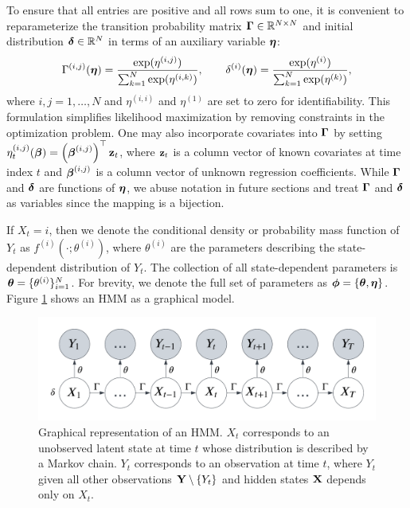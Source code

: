 To ensure that all entries are positive and all rows sum to one, it is convenient to reparameterize the transition probability matrix $\boldsymbol{\Gamma} \in \mathbb{R}^{N \times N}$ and initial distribution $\boldsymbol{\delta} \in \mathbb{R}^N$ in terms of an auxiliary variable $\boldsymbol{\eta}$: %
%
\begin{equation}
    \Gamma^{(i,j)}(\boldsymbol{\eta}) = \frac{\exp(\eta^{(i,j)})}{\sum_{k=1}^N \exp(\eta^{(i,k)})}, \qquad \delta^{(i)}(\boldsymbol{\eta}) = \frac{\exp(\eta^{(i)})}{\sum_{k=1}^N \exp(\eta^{(k)})},
    \label{eqn:reparam}
\end{equation}
%
where $i,j = 1,\ldots,N$ and $\eta^{(i,i)}$ and $\eta^{(1)}$ are set to zero for identifiability. This formulation simplifies likelihood maximization by removing constraints in the optimization problem. One may also incorporate covariates into $\boldsymbol{\Gamma}$ by setting $\eta_t^{(i,j)}(\boldsymbol{\beta}) = \left(\boldsymbol{\beta}^{(i,j)}\right)^{\top} \mathbf{z}_t$, where $\mathbf{z}_t$ is a column vector of known covariates at time index $t$ and $\boldsymbol{\beta}^{(i,j)}$ is a column vector of unknown regression coefficients. While $\boldsymbol{\Gamma}$ and $\boldsymbol{\delta}$ are functions of $\boldsymbol{\eta}$, we abuse notation in future sections and treat $\boldsymbol{\Gamma}$ and $\boldsymbol{\delta}$ as variables since the mapping is a bijection.

If $X_t=i$, then we denote the conditional density or probability mass function of $Y_t$ as $f^{(i)}(\cdot ; \theta^{(i)})$, where $\theta^{(i)}$ are the parameters describing the state-dependent distribution of $Y_t$. The collection of all state-dependent parameters is $\boldsymbol{\theta} = \{\theta^{(i)}\}_{i=1}^N$. For brevity, we denote the full set of parameters as $\boldsymbol{\phi} = \{\boldsymbol{\theta},\boldsymbol{\eta}\}$. Figure \ref{fig:HMM} shows an HMM as a graphical model.
%
\begin{figure}[h]
    \centering
    \includegraphics[width=5in]{../plt/HMM.png}
    \caption{Graphical representation of an HMM. $X_t$ corresponds to an unobserved latent state at time $t$ whose distribution is described by a Markov chain. $Y_t$ corresponds to an observation at time $t$, where $Y_t$ given all other observations $\mathbf{Y} \setminus \{Y_t\}$ and hidden states $\mathbf{X}$ depends only on $X_t$.}
    \label{fig:HMM}
\end{figure}
%

